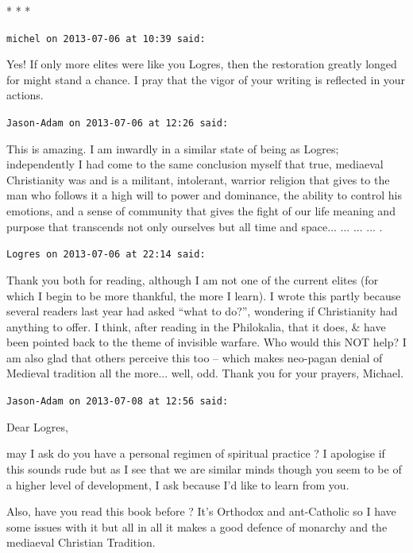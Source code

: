 
\begin{center}* * *\end{center}

\begin{footnotesize}
\begin{sffamily}
\texttt{michel on 2013-07-06 at 10:39 said:}

Yes! If only more elites were like you Logres, then the restoration greatly longed for might stand a chance. I pray that the vigor of your writing is reflected in your actions.

\hfill

\texttt{Jason-Adam on 2013-07-06 at 12:26 said:}

This is amazing. I am inwardly in a similar state of being as Logres; independently I had come to the same conclusion myself that true, mediaeval Christianity was and is a militant, intolerant, warrior religion that gives to the man who follows it a high will to power and dominance, the ability to control his emotions, and a sense of community that gives the fight of our life meaning and purpose that transcends not only ourselves but all time and space... ... ... ... .

\hfill

\texttt{Logres on 2013-07-06 at 22:14 said:}

Thank you both for reading, although I am not one of the current elites (for which I begin to be more thankful, the more I learn). I wrote this partly because several readers last year had asked ``what to do?'', wondering if Christianity had anything to offer. I think, after reading in the Philokalia, that it does, \& have been pointed back to the theme of invisible warfare. Who would this NOT help? I am also glad that others perceive this too -- which makes neo-pagan denial of Medieval tradition all the more... well, odd. Thank you for your prayers, Michael.

\hfill

\texttt{Jason-Adam on 2013-07-08 at 12:56 said:}

Dear Logres,

may I ask do you have a personal regimen of spiritual practice ? I apologise if this sounds rude but as I see that we are similar minds though you seem to be of a higher level of development, I ask because I'd like to learn from you.

Also, have you read this book before ? It's Orthodox and ant-Catholic so I have some issues with it but all in all it makes a good defence of monarchy and the mediaeval Christian Tradition.


\end{sffamily}
\end{footnotesize}
